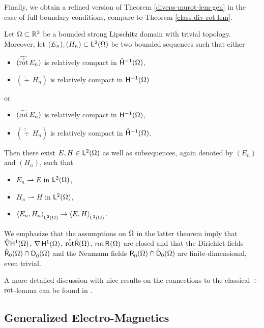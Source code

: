 \documentclass[a4paper]{amsart}
\newcommand{\wto}{\rightharpoonup}
\newcommand{\hmoc}{\mathring\hsymbol^{-1}}
\newcommand{\hmocom}{\hmoc(\om)}
\renewcommand{\dc}{\mathring\dsymbol}
\newcommand{\grad}{\na}
\newcommand{\gradc}{\mathring\grad}
\renewcommand{\rotc}{\mathring\rot}
\renewcommand{\divc}{\mathring\div}
\begin{document}
Finally, we obtain a refined version of Theorem \ref{diveps-murot-lem-gen}
in the case of full boundary conditions, compare to Theorem \ref{class-div-rot-lem}.

\begin{theo}
Let $\Omega\subset\mathbb{R}^{3}$ be a bounded strong Lipschitz domain with trivial topology.
Moreover, let $(E_{n}),(H_{n})\subset\overset{}{\mathsf{L}}{}^{2}_{}(\Omega)$ be two bounded sequences such that either
\begin{itemize}
\item
$(\widetilde{\rotc}\,E_{n})$ is relatively compact in $\hmocom$,
\item
$(\widetilde{\div}\,H_{n})$ is relatively compact in $\overset{}{\mathsf{H}}{}^{-1}_{}(\Omega)$
\end{itemize}
or
\begin{itemize}
\item
$(\widetilde{\operatorname{rot}}\,E_{n})$ is relatively compact in $\overset{}{\mathsf{H}}{}^{-1}_{}(\Omega)$,
\item
$(\widetilde{\divc}\,H_{n})$ is relatively compact in $\hmocom$.
\end{itemize}
Then there exist $E,H\in\overset{}{\mathsf{L}}{}^{2}_{}(\Omega)$ as well as subsequences, again denoted by $(E_{n})$ and $(H_{n})$, 
such that
\begin{itemize}
\item
$E_{n}\wto E$ in $\overset{}{\mathsf{L}}{}^{2}_{}(\Omega)$,
\item
$H_{n}\wto H$ in $\overset{}{\mathsf{L}}{}^{2}_{}(\Omega)$,
\item
$\langle E_{n},H_{n}\rangle_{\overset{}{\mathsf{L}}{}^{2}_{}(\Omega)}\to\langle E,H\rangle_{\overset{}{\mathsf{L}}{}^{2}_{}(\Omega)}$.
\end{itemize}
\end{theo}

We emphasize that the assumptions on $\Omega$ in the latter theorem imply
that $\gradc\hocom$, $\grad\hoom$, $\rotc\rcom$, $\operatorname{rot}\overset{}{\mathsf{R}}{}^{}_{}(\Omega)$ are closed
and that the Dirichlet fields $\mathring{\mathsf{R}}_{0}(\Omega)\cap\overset{}{\mathsf{D}}{}^{}_{0}(\Omega)$
and the Neumann fields $\rzom\cap\dc_{0}(\om)$ are finite-dimensional,
even trivial.

A more detailed discussion with nice results
on the connections to the classical $\div$-$\operatorname{rot}$-lemma
can be found in \cite{waurick2018a}.

\subsection{Generalized Electro-Magnetics}
\end{document}
